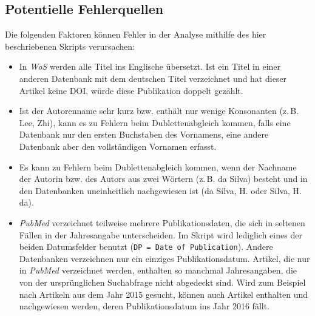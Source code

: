 \subsection{Potentielle Fehlerquellen}
Die folgenden Faktoren können Fehler in der Analyse mithilfe des hier beschriebenen Skripts verursachen:
\begin{itemize}
\item In \textit{WoS} werden alle Titel ins Englische übersetzt. Ist ein Titel in einer anderen Datenbank mit dem deutschen Titel verzeichnet und hat dieser Artikel keine DOI, würde diese Publikation doppelt gezählt.
\item Ist der Autorenname sehr kurz bzw. enthält nur wenige Konsonanten (z.\,B. Lee, Zhi), kann es zu Fehlern beim Dublettenabgleich kommen, falls eine Datenbank nur den ersten Buchstaben des Vornamens, eine andere Datenbank aber den vollständigen Vornamen erfasst.
\item Es kann zu Fehlern beim Dublettenabgleich kommen, wenn der Nachname der Autorin bzw. des Autors aus zwei Wörtern (z.\,B. da Silva) besteht und in den Datenbanken uneinheitlich nachgewiesen ist (da Silva, H. oder Silva, H. da).
\item \textit{PubMed} verzeichnet teilweise mehrere Publikationsdaten, die sich in seltenen Fällen in der Jahresangabe unterscheiden. Im Skript wird lediglich eines der beiden Datumsfelder benutzt (\texttt{DP = Date of Publication}). Andere Datenbanken verzeichnen nur ein einziges Publikationsdatum. Artikel, die nur in \textit{PubMed} verzeichnet werden, enthalten so manchmal Jahresangaben, die von der ursprünglichen Suchabfrage nicht abgedeckt sind. Wird zum Beispiel nach Artikeln aus dem Jahr 2015 gesucht, können auch Artikel enthalten und nachgewiesen werden, deren Publikationsdatum ins Jahr 2016 fällt.
\end{itemize}

